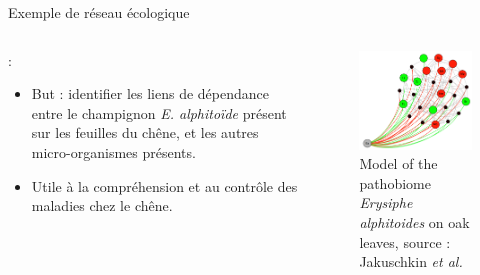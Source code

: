 \documentclass{bredelebeamer}
\begin{document}




\begin{frame}{Exemple de réseau écologique}
\begin{columns}
\begin{column}{0.45\linewidth}

\cite{jakuch}:\\


\begin{itemize}
\item But : identifier les liens de dépendance entre le champignon \textit{E. alphitoïde} présent sur les feuilles du chêne, et les autres micro-organismes présents.\vspace{0.4cm}
\item Utile à la compréhension et au contrôle des maladies chez le chêne.
\end{itemize}

\vspace{0.4cm}
\end{column}
\begin{column}{0.55\linewidth}
\begin{figure}
\includegraphics[scale=0.45]{illu_reseau}
\caption{Model of the pathobiome \textit{Erysiphe alphitoides} on oak leaves, source : Jakuschkin \textit{et al.} }
\end{figure}
\end{column}
\end{columns}

\end{frame}
\end{document}
